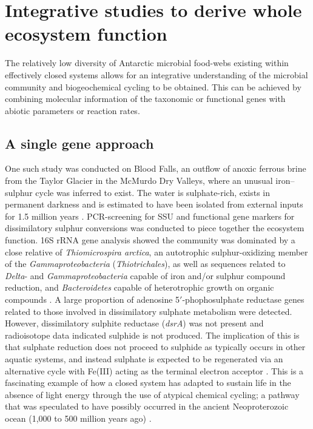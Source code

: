 

\section{Integrative studies to derive whole ecosystem function}
\label{sec:integrative}
The relatively low diversity of Antarctic microbial food-webs existing within effectively closed systems allows for an integrative understanding of the microbial community and biogeochemical cycling to be obtained. 
This can be achieved by combining molecular information of the taxonomic or functional genes with abiotic parameters or reaction rates.

\subsection{A single gene approach}
One such study was conducted on Blood Falls, an outflow of anoxic ferrous brine from the Taylor Glacier in the McMurdo Dry Valleys, where an unusual iron--sulphur cycle was inferred to exist. 
The water is sulphate-rich, exists in permanent darkness and is estimated to have been isolated from external inputs for 1.5 million years \cite{Mikucki2009}.
\ac{PCR}-screening for \ac{SSU} and functional gene markers for dissimilatory sulphur conversions was conducted to piece together the ecosystem function.  
16S rRNA gene analysis showed the community was dominated by a close relative of \emph{Thiomicrospira arctica}, an autotrophic sulphur-oxidizing member of the \emph{Gammaproteobacteria} (\emph{Thiotrichales}), as well as sequences related to \emph{Delta}- and \emph{Gammaproteobacteria} capable of iron and/or sulphur compound reduction, and \emph{Bacteroidetes} capable of heterotrophic growth on organic compounds \cite{Mikucki2007}.
A large proportion of adenosine 5$'$-phophosulphate reductase genes related to those involved in dissimilatory sulphate metabolism were detected. 
However, dissimilatory sulphite reductase (\emph{dsrA}) was not present and radioisotope data indicated sulphide is not produced. 
The implication of this is that sulphate reduction does not proceed to sulphide as typically occurs in other aquatic systems, and instead sulphate is expected to be regenerated via an alternative cycle with Fe(III) acting as the terminal electron acceptor \cite{Mikucki2009}. 
This is a fascinating example of how a closed system has adapted to sustain life in the absence of light energy through the use of atypical chemical cycling; a pathway that was speculated to have possibly occurred in the ancient Neoproterozoic ocean (1,000 to 500 million years ago) \cite{Mikucki2009}.

